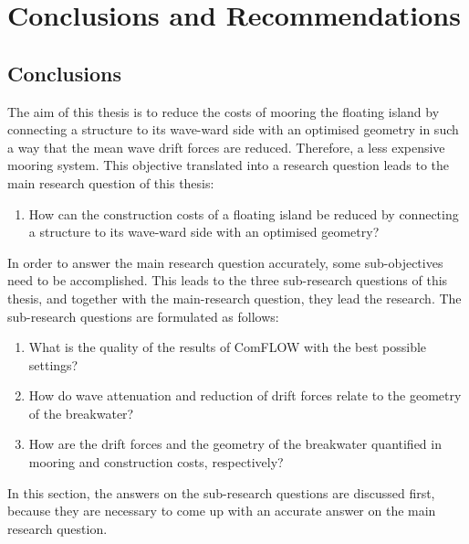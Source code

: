 \chapter{Conclusions and Recommendations}
\label{ch: conclusions recommendations}

\section{Conclusions}
The aim of this thesis is to reduce the costs of mooring the floating island by connecting a structure to its wave-ward side with an optimised geometry in such a way that the mean wave drift forces are reduced. Therefore, a less expensive mooring system. This objective translated into a research question leads to the main research question of this thesis:

\begin{enumerate}
    \item How can the construction costs of a floating island be reduced by connecting a structure to its wave-ward side with an optimised geometry?
\end{enumerate}

In order to answer the main research question accurately, some sub-objectives need to be accomplished. This leads to the three sub-research questions of this thesis, and together with the main-research question, they lead the research. The sub-research questions are formulated as follows:

\begin{enumerate}[resume]
    \item What is the quality of the results of ComFLOW with the best possible settings?
    \item How do wave attenuation and reduction of drift forces relate to the geometry of the breakwater?
    \item How are the drift forces and the geometry of the breakwater quantified in mooring and construction costs, respectively?
\end{enumerate}



In this section, the answers on the sub-research questions are discussed first, because they are necessary to come up with an accurate answer on the main research question. 

